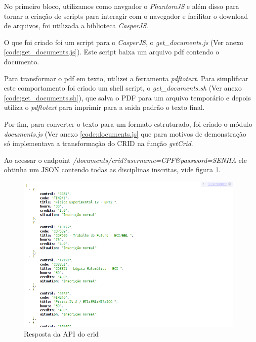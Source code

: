 No primeiro bloco, utilizamos como navgador o \textit{PhantomJS} e além disso para tornar a criação de scripts para interagir com o navegador e facilitar o download de arquivos, foi utilizada a biblioteca \textit{CasperJS}.

O que foi criado foi um script para o \textit{CasperJS}, o \textit{get\_documents.js} (Ver anexo \ref{code:get_documents.js}). Este script baixa um arquivo pdf contendo o documento.

Para transformar o pdf em texto, utilizei a ferramenta \textit{pdftotext}. Para simplificar este comportamento foi criado um shell script, o \textit{get\_documents.sh} (Ver anexo \ref{code:get_documents.sh}), que salva o PDF para um arquivo temporário e depois utiliza o \textit{pdftotext} para imprimir para a saida padrão o texto final.

Por fim, para converter o texto para um formato estruturado, foi criado o módulo \textit{documents.js} (Ver anexo \ref{code:documents.js} que para motivos de demonstração só implementava a transformação do CRID na função \textit{getCrid}.

Ao acessar o endpoint \textit{/documents/crid?username=CPF\&password=SENHA} ele obtinha um JSON contendo todas as disciplinas inscritas, vide figura \ref{fig:api_crid}.

\begin{figure}[!ht]
\centering
	\includegraphics[width=\textwidth]{api_crid.png}
  \caption{Resposta da API do crid}
\label{fig:api_crid}
\end{figure}

